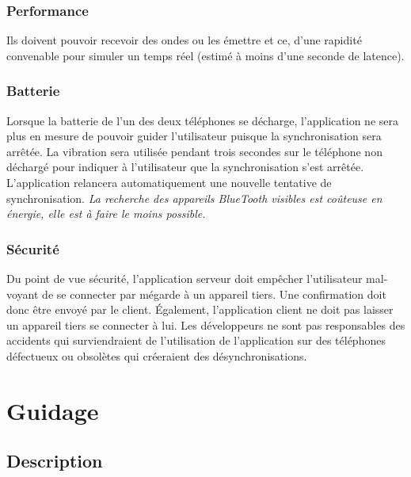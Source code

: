 \documentclass[12pt]{report}
\begin{document}
\subsubsection{Performance} Ils doivent pouvoir recevoir des ondes ou les émettre et ce, d'une rapidité convenable pour simuler un temps réel (estimé à moins d'une seconde de latence).

\subsubsection{Batterie}
Lorsque la batterie de l'un des deux téléphones se décharge, l'application ne sera plus en mesure de pouvoir guider l'utilisateur puisque la synchronisation sera arrêtée. La vibration sera utilisée pendant trois secondes sur le téléphone non déchargé pour indiquer à l'utilisateur que la synchronisation s'est arrêtée. L'application relancera automatiquement une nouvelle tentative de synchronisation. \emph{La recherche des appareils BlueTooth visibles est coûteuse en énergie, elle est à faire le moins possible.}

\subsubsection{Sécurité}

Du point de vue sécurité, l'application serveur doit empêcher l'utilisateur mal-voyant de se connecter par mégarde à un appareil tiers. Une confirmation doit donc être envoyé par le client. Également, l'application client ne doit pas laisser un appareil tiers se connecter à lui. 
Les développeurs ne sont pas responsables des accidents qui surviendraient de l'utilisation de l'application sur des téléphones défectueux ou obsolètes qui créeraient des désynchronisations.

\section{Guidage}

\subsection{Description}
\end{document}
